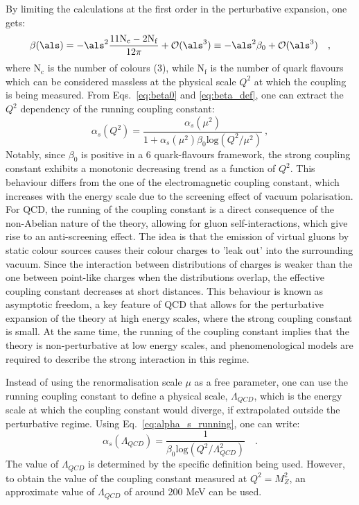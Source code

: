 By limiting the calculations at the first order in the perturbative expansion, one gets:
\begin{equation}\label{eq:beta0}
    \beta(\als) = -\als^2 \frac{11 \mathrm{N_c} - 2 \mathrm{N_f}}{12\pi} + \mathcal{O}(\als^3) \equiv -\als^2 \beta_0 + \mathcal{O}(\als^3)\quad ,
\end{equation}
where $\mathrm{N_c}$ is the number of colours (3), while $\mathrm{N_f}$ is the number of quark flavours which can be considered massless at the physical scale $Q^2$ at which the coupling is being measured.
From Eqs.~\ref{eq:beta0} and \ref{eq:beta_def}, one can extract the $Q^2$ dependency of the running coupling constant:
\begin{equation}\label{eq:alpha_s_running}
    \alpha_s(Q^2) = \frac{\alpha_s(\mu^2)}{1+\alpha_s(\mu^2)\beta_0 \mathrm{log}(Q^2/\mu^2)}\ ,
\end{equation}
Notably, since $\beta_0$ is positive in a 6 quark-flavours framework, the strong coupling constant exhibits a monotonic decreasing trend as a function of $Q^2$. This behaviour differs from the one of the electromagnetic coupling constant, which increases with the energy scale due to the screening effect of vacuum polarisation. For QCD, the running of the coupling constant is a direct consequence of the non-Abelian nature of the theory, allowing for gluon self-interactions, which give rise to an anti-screening effect. The idea is that the emission of virtual gluons by static colour sources causes their colour charges to 'leak out' into the surrounding vacuum. Since the interaction between distributions of charges is weaker than the one between point-like charges when the distributions overlap, the effective coupling constant decreases at short distances. This behaviour is known as asymptotic freedom, a key feature of QCD that allows for the perturbative expansion of the theory at high energy scales, where the strong coupling constant is small. At the same time, the running of the coupling constant implies that the theory is non-perturbative at low energy scales, and phenomenological models are required to describe the strong interaction in this regime. 

Instead of using the renormalisation scale $\mu$ as a free parameter, one can use the running coupling constant to define a physical scale, $\Lambda_{QCD}$, which is the energy scale at which the coupling constant would diverge, if extrapolated outside the perturbative regime. Using Eq.~\ref{eq:alpha_s_running}, one can write:
\begin{equation*}
    \alpha_s(\Lambda_{QCD}) = \frac{1}{\beta_0 \mathrm{log}(Q^2/\Lambda_{QCD}^2)}\quad .
\end{equation*}
The value of $\Lambda_{QCD}$ is determined by the specific definition being used. However, to obtain the value of the coupling constant measured at $Q^2 = M_Z^2$, an approximate value of $\Lambda_{QCD}$ of around 200 MeV can be used.


